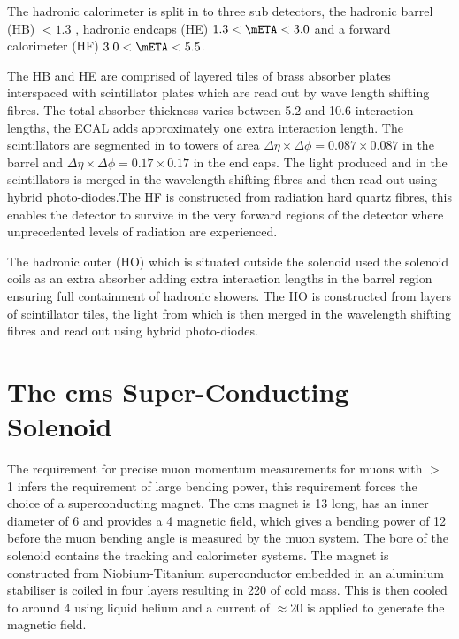 The hadronic calorimeter is split in to three sub detectors, the hadronic 
barrel (HB) \mETA $< 1.3$ , hadronic endcaps (HE) $1.3 < \mETA < 3.0$ and a 
forward calorimeter (HF) $3.0 < \mETA < 5.5$.

The HB and HE are comprised of layered tiles of brass absorber plates 
interspaced with scintillator plates which are read out by wave length shifting 
fibres. The total absorber thickness varies between 5.2 and 10.6 interaction 
lengths, the ECAL adds approximately one extra interaction length. The 
scintillators are segmented in to towers of area $\Delta\eta\times\Delta\phi = 
0.087\times0.087$ in the barrel and $\Delta\eta\times\Delta\phi = 
0.17\times0.17$ in the end caps. The light produced and in the scintillators is 
merged in the wavelength shifting fibres and then read out using hybrid 
photo-diodes.The HF is constructed from radiation hard quartz fibres, this 
enables the detector to survive in the very forward regions of the detector 
where unprecedented levels of radiation are experienced.

The hadronic outer (HO) which is situated outside the solenoid used the 
solenoid coils as an extra absorber adding extra interaction lengths in the 
barrel region ensuring full containment of hadronic showers. The HO is 
constructed from layers of scintillator tiles, the light from which is then merged in the wavelength shifting fibres and read out using hybrid photo-diodes.


\section{The \ac{cms} Super-Conducting Solenoid} %
\label{sec:the_cms_super_conducting_solenoid}
The requirement for precise muon momentum measurements for muons with \PT $>$ 
\unit{1}{\TeV} infers the requirement of large bending power, this requirement 
forces the choice of a superconducting magnet. The \ac{cms} magnet is 
\unit{13}{\meter} long, has an inner diameter of \unit{6}{\meter} and provides 
a \unit{4}{\tesla} magnetic field, which gives a bending power of 
\unit{12}{\tesla\meter} before the muon bending angle is measured by the muon 
system. The bore of the solenoid contains the tracking and calorimeter systems.
The magnet is constructed from Niobium-Titanium superconductor embedded in an 
aluminium stabiliser is coiled in four layers resulting in \unit{220}{\ton} of 
cold mass. This is then cooled to around \unit{4}{\kelvin} using liquid helium 
and a current of $\approx$\unit{20}{\kilo\ampere} is applied to generate the 
magnetic field.

